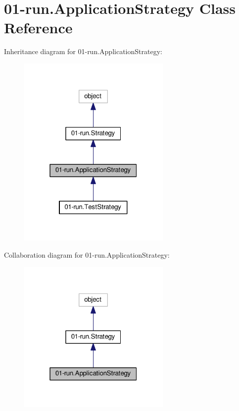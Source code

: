 \hypertarget{class01-run_1_1ApplicationStrategy}{}\section{01-\/run.Application\+Strategy Class Reference}
\label{class01-run_1_1ApplicationStrategy}


Inheritance diagram for 01-\/run.Application\+Strategy\+:
\nopagebreak
\begin{figure}[H]
\begin{center}
\leavevmode
\includegraphics[width=211pt]{class01-run_1_1ApplicationStrategy__inherit__graph}
\end{center}
\end{figure}


Collaboration diagram for 01-\/run.Application\+Strategy\+:
\nopagebreak
\begin{figure}[H]
\begin{center}
\leavevmode
\includegraphics[width=211pt]{class01-run_1_1ApplicationStrategy__coll__graph}
\end{center}
\end{figure}
